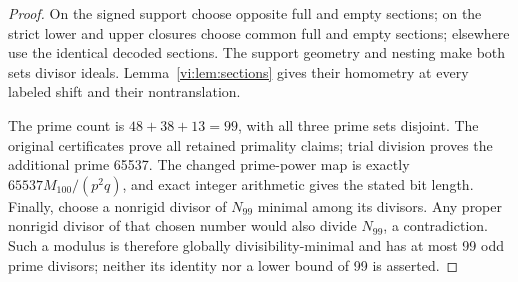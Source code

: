 \begin{proof}
On the signed support choose opposite full and empty sections; on the strict lower and upper closures choose common full and empty sections; elsewhere use the identical decoded sections. The support geometry and nesting make both sets divisor ideals. Lemma~\ref{vi:lem:sections} gives their homometry at every labeled shift and their nontranslation.

The prime count is $48+38+13=99$, with all three prime sets disjoint. The original certificates prove all retained primality claims; trial division proves the additional prime 65537. The changed prime-power map is exactly $65537M_{100}/(p^2q)$, and exact integer arithmetic gives the stated bit length. Finally, choose a nonrigid divisor of $N_{99}$ minimal among its divisors. Any proper nonrigid divisor of that chosen number would also divide $N_{99}$, a contradiction. Such a modulus is therefore globally divisibility-minimal and has at most 99 odd prime divisors; neither its identity nor a lower bound of 99 is asserted.
\end{proof}
